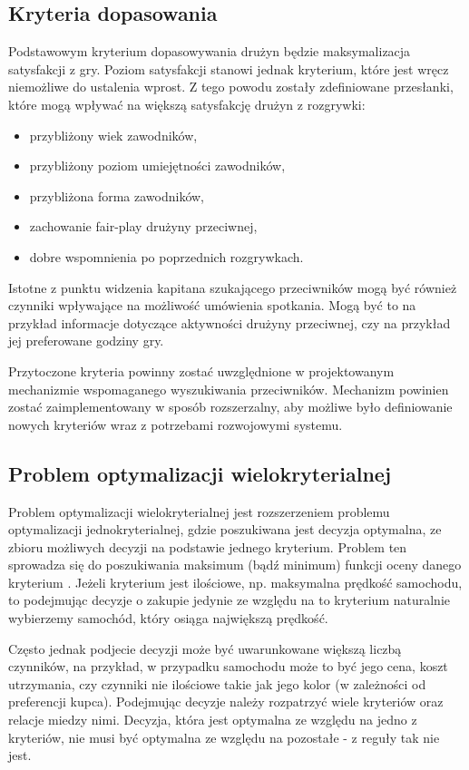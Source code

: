 \subsection{Kryteria dopasowania}

Podstawowym kryterium dopasowywania drużyn będzie maksymalizacja satysfakcji z gry. Poziom satysfakcji stanowi jednak kryterium, które jest wręcz niemożliwe do ustalenia wprost. Z tego powodu zostały zdefiniowane przesłanki, które mogą wpływać na większą satysfakcję drużyn z rozgrywki:

\begin{itemize}
\item{przybliżony wiek zawodników,}
\item{przybliżony poziom umiejętności zawodników,}
\item{przybliżona forma zawodników,}
\item{zachowanie fair-play drużyny przeciwnej,}
\item{dobre wspomnienia po poprzednich rozgrywkach.}
\end{itemize}

Istotne z punktu widzenia kapitana szukającego przeciwników mogą być również czynniki wpływające na możliwość umówienia spotkania. Mogą być to na przykład informacje dotyczące aktywności drużyny przeciwnej, czy na przykład jej preferowane godziny gry.

Przytoczone kryteria powinny zostać uwzględnione w projektowanym mechanizmie wspomaganego wyszukiwania przeciwników. Mechanizm powinien zostać zaimplementowany w sposób rozszerzalny, aby możliwe było definiowanie nowych kryteriów wraz z potrzebami rozwojowymi systemu.

\subsection{Problem optymalizacji wielokryterialnej}

Problem optymalizacji wielokryterialnej jest rozszerzeniem problemu optymalizacji jednokryterialnej, gdzie poszukiwana jest decyzja optymalna, ze zbioru możliwych decyzji na podstawie jednego kryterium. Problem ten sprowadza się do poszukiwania maksimum (bądź minimum) funkcji oceny danego kryterium \cite{optwielok}. Jeżeli kryterium jest ilościowe, np. maksymalna prędkość samochodu, to podejmując decyzje o zakupie jedynie ze względu na to kryterium naturalnie wybierzemy samochód, który osiąga największą prędkość. 

Często jednak podjecie decyzji może być uwarunkowane większą liczbą czynników, na przykład, w przypadku samochodu może to być jego cena, koszt utrzymania, czy czynniki nie ilościowe takie jak jego kolor (w zależności od preferencji kupca). Podejmując decyzje należy rozpatrzyć wiele kryteriów oraz relacje miedzy nimi. Decyzja, która jest optymalna ze względu na jedno z kryteriów, nie musi być optymalna ze względu na pozostałe - z reguły tak nie jest.


